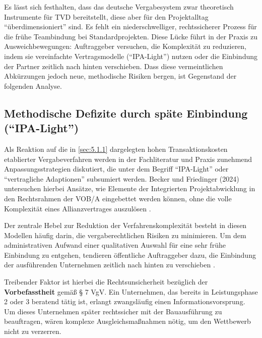 Es lässt sich festhalten, dass das deutsche Vergabesystem zwar theoretisch Instrumente für \acs{TVD} bereitstellt, diese aber für den Projektalltag \enquote{überdimensioniert} sind. Es fehlt ein niederschwelliger, rechtssicherer Prozess für die frühe Teambindung bei Standardprojekten.
Diese Lücke führt in der Praxis zu Ausweichbewegungen: Auftraggeber versuchen, die Komplexität zu reduzieren, indem sie vereinfachte Vertragsmodelle (\enquote{\acs{IPA}-Light}) nutzen oder die Einbindung der Partner zeitlich nach hinten verschieben. Dass diese vermeintlichen Abkürzungen jedoch neue, methodische Risiken bergen, ist Gegenstand der folgenden Analyse.

\subsection{Methodische Defizite durch späte Einbindung (\enquote{IPA-Light})}
\label{sec:5.1.2}

Als Reaktion auf die in \cref{sec:5.1.1} dargelegten hohen Transaktionskosten etablierter Vergabeverfahren werden in der Fachliteratur und Praxis zunehmend Anpassungsstrategien diskutiert, die unter dem Begriff \enquote{\acs{IPA}-Light} oder \enquote{vertragliche Adaptionen} subsumiert werden. Becker und Friedinger (2024) untersuchen hierbei Ansätze, wie Elemente der Integrierten Projektabwicklung in den Rechtsrahmen der \acs{VOB}/A eingebettet werden können, ohne die volle Komplexität eines Allianzvertrages auszulösen \autocite[Vgl.][S.~14]{becker_adaptionen_2024}.

Der zentrale Hebel zur Reduktion der Verfahrenskomplexität besteht in diesen Modellen häufig darin, die vergaberechtlichen Risiken zu minimieren. Um dem administrativen Aufwand einer qualitativen Auswahl für eine sehr frühe Einbindung zu entgehen, tendieren öffentliche Auftraggeber dazu, die Einbindung der ausführenden Unternehmen zeitlich nach hinten zu verschieben \autocite[Vgl.][S.~16]{becker_adaptionen_2024}.

Treibender Faktor ist hierbei die Rechtsunsicherheit bezüglich der \textbf{Vorbefasstheit} gemäß § 7 VgV. Ein Unternehmen, das bereits in Leistungsphase 2 oder 3 beratend tätig ist, erlangt zwangsläufig einen Informationsvorsprung. Um dieses Unternehmen später rechtssicher mit der Bauausführung zu beauftragen, wären komplexe Ausgleichsmaßnahmen nötig, um den Wettbewerb nicht zu verzerren. \autocite[Vgl.][§~7]{vgv_verordnung_2016}

